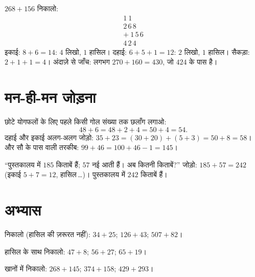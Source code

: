 \begin{example}\label{ex:g2:addition:worked}
$268 + 156$ निकालो:
\[
\begin{array}{r}
{\scriptstyle 1}\ {\scriptstyle 1}\ \phantom{0} \\[-3pt]
2\,6\,8 \\
+\ 1\,5\,6 \\
\hline
4\,2\,4
\end{array}
\]
इकाई: $8 + 6 = 14$: $4$ लिखो, $1$ हासिल। दहाई:
$6 + 5 + 1 = 12$: $2$ लिखो, $1$ हासिल। सैकड़ा:
$2 + 1 + 1 = 4$। अंदाज़े से जाँच: लगभग $270 + 160 = 430$, जो
$424$ के पास है। \checkmark
\end{example}

\section{मन-ही-मन जोड़ना}

\begin{example}[दहाई बनाओ]\label{ex:g2:addition:mental}
छोटे योगफलों के लिए पहले किसी गोल संख्या तक छलाँग लगाओ:
\[
48 + 6 = 48 + 2 + 4 = 50 + 4 = 54 .
\]
दहाई और इकाई अलग-अलग जोड़ो:
$35 + 23 = (30 + 20) + (5 + 3) = 50 + 8 = 58$। और सौ के पास
वाली तरकीब: $99 + 46 = 100 + 46 - 1 = 145$।
\end{example}

\begin{example}[एक छोटी समस्या]\label{ex:g2:addition:problem}
``पुस्तकालय में $185$ किताबें हैं; $57$ नई आती हैं। अब कितनी
किताबें?'' जोड़ो: $185 + 57 = 242$ (इकाई $5 + 7 = 12$, हासिल\,\dots)।
पुस्तकालय में $242$ किताबें हैं।
\end{example}

\section{अभ्यास}

\begin{exercise}[$\star$]\label{exo:g2:addition:1}
निकालो (हासिल की ज़रूरत नहीं): $34 + 25$; \quad $126 + 43$; \quad
$507 + 82$।
\end{exercise}

\begin{exercise}[$\star$]\label{exo:g2:addition:2}
हासिल के साथ निकालो: $47 + 8$; \quad $56 + 27$; \quad $65 + 19$।
\end{exercise}

\begin{exercise}[$\star$]\label{exo:g2:addition:3}
खानों में निकालो: $268 + 145$; \quad $374 + 158$; \quad
$429 + 293$।
\end{exercise}

